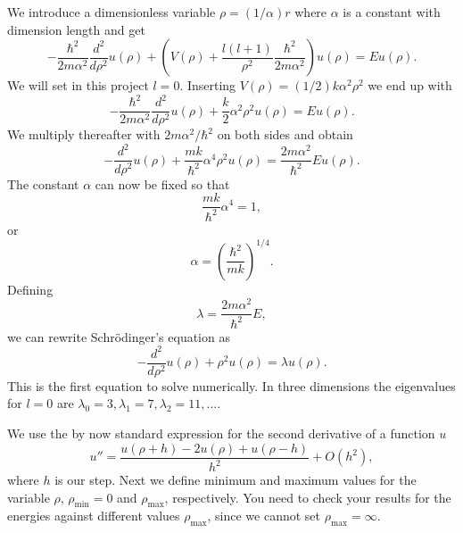 \documentclass[11pt,a4wide]{article}
\begin{document}
We introduce a dimensionless variable $\rho = (1/\alpha) r$
where $\alpha$ is a constant with dimension length and get
% 
\[
  -\frac{\hbar^2}{2 m \alpha^2} \frac{d^2}{d\rho^2} u(\rho) 
       + \left ( V(\rho) + \frac{l (l + 1)}{\rho^2}
         \frac{\hbar^2}{2 m\alpha^2} \right ) u(\rho)  = E u(\rho) .
\]
%
We will set in this project $l=0$.
Inserting $V(\rho) = (1/2) k \alpha^2\rho^2$ we end up with
\[
  -\frac{\hbar^2}{2 m \alpha^2} \frac{d^2}{d\rho^2} u(\rho) 
       + \frac{k}{2} \alpha^2\rho^2u(\rho)  = E u(\rho) .
\]
We multiply thereafter with $2m\alpha^2/\hbar^2$ on both sides and obtain
\[
  -\frac{d^2}{d\rho^2} u(\rho) 
       + \frac{mk}{\hbar^2} \alpha^4\rho^2u(\rho)  = \frac{2m\alpha^2}{\hbar^2}E u(\rho) .
\]
The constant $\alpha$ can now be fixed
so that
\[
\frac{mk}{\hbar^2} \alpha^4 = 1,
\]
or 
\[
\alpha = \left(\frac{\hbar^2}{mk}\right)^{1/4}.
\]
Defining 
\[
\lambda = \frac{2m\alpha^2}{\hbar^2}E,
\]
we can rewrite Schr\"odinger's equation as
\[
  -\frac{d^2}{d\rho^2} u(\rho) + \rho^2u(\rho)  = \lambda u(\rho) .
\]
This is the first equation to solve numerically. In three dimensions 
the eigenvalues for $l=0$ are 
$\lambda_0=3,\lambda_1=7,\lambda_2=11,\dots .$

We use the by now standard
expression for the second derivative of a function $u$
\begin{equation}
    u''=\frac{u(\rho+h) -2u(\rho) +u(\rho-h)}{h^2} +O(h^2),
    \label{eq:diffoperation}
\end{equation} 
where $h$ is our step.
Next we define minimum and maximum values for the variable $\rho$,
$\rho_{\mathrm{min}}=0$  and $\rho_{\mathrm{max}}$, respectively.
You need to check your results for the energies against different values
$\rho_{\mathrm{max}}$, since we cannot set
$\rho_{\mathrm{max}}=\infty$. 
\end{document}
